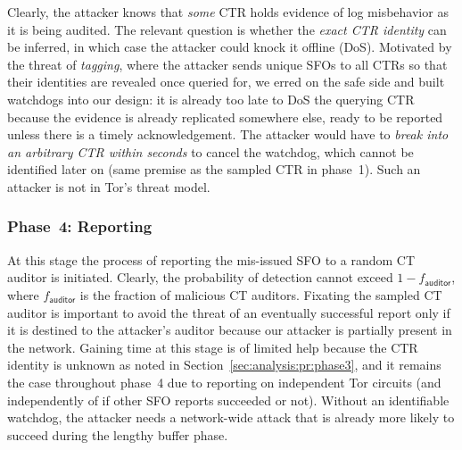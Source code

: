 Clearly, the attacker knows that \emph{some} CTR holds evidence of log
misbehavior as it is being audited.  The relevant question is whether the
\emph{exact CTR identity} can be inferred, in which case the attacker could
knock it offline (DoS).  Motivated by the threat of \emph{tagging}, where the
attacker sends unique SFOs to all CTRs so that their identities are revealed
once queried for, we erred on the safe side and built watchdogs into our design:
it is already too late to DoS the querying CTR because the evidence is already
replicated somewhere else, ready to be reported unless there is a timely
acknowledgement. The attacker would have to \emph{break into an arbitrary CTR
within seconds} to cancel the watchdog, which cannot be identified later on
(same premise as the sampled CTR in phase~1).  Such an attacker is not in Tor's
threat model.

\subsubsection{Phase~4: Reporting} \label{sec:analysis:pr:phase4} 
At this stage the process of reporting the mis-issued SFO to a random CT auditor
is initiated.  Clearly, the probability of detection cannot exceed
$1-f_{\mathsf{auditor}}$, where $f_{\mathsf{auditor}}$ is the fraction of
malicious CT auditors.  Fixating the sampled CT auditor is important to avoid
the threat of an eventually successful report only if it is destined to the
attacker's auditor because our attacker is partially present in the network.
Gaining time at this stage is of limited help because the CTR identity is
unknown as noted in Section~\ref{sec:analysis:pr:phase3}, and it remains the
case throughout phase~4 due to reporting on independent Tor circuits (and
independently of if other SFO reports succeeded or not).  Without an
identifiable watchdog, the attacker needs a network-wide attack that is already
more likely to succeed during the lengthy buffer phase.
